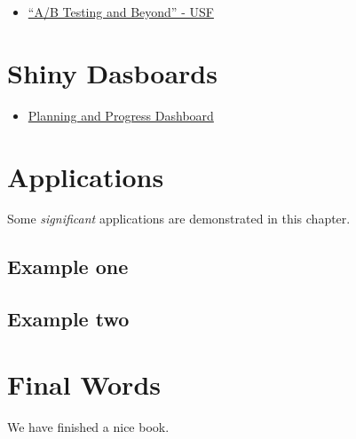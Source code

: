 \documentclass[]{book}
\providecommand{\tightlist}{%
  \setlength{\itemsep}{0pt}\setlength{\parskip}{0pt}}
\theoremstyle{definition}
\theoremstyle{definition}
\theoremstyle{definition}
\theoremstyle{remark}
\begin{document}
\begin{itemize}
\tightlist
\item
  \href{https://github.com/ntstevens/A-B-Testing-and-Beyond}{``A/B
  Testing and Beyond'' - USF}
\end{itemize}

\chapter{Shiny Dasboards}\label{shiny-dasboards}

\begin{itemize}
\tightlist
\item
  \href{https://github.com/Lingtax/PlanningProgressDashboard}{Planning
  and Progress Dashboard}
\end{itemize}

\chapter{Applications}\label{applications}

Some \emph{significant} applications are demonstrated in this chapter.

\section{Example one}\label{example-one}

\section{Example two}\label{example-two}

\chapter{Final Words}\label{final-words}

We have finished a nice book.


\end{document}
